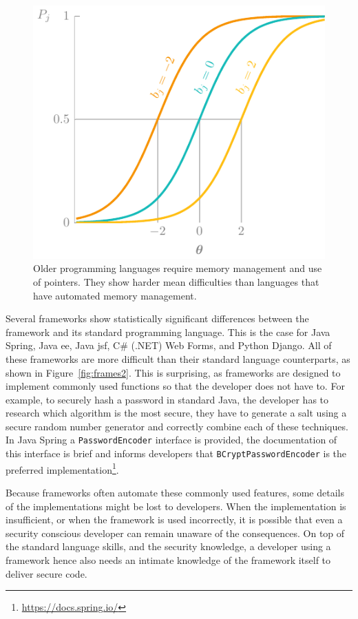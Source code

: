 \begin{figure}
    \centering
    \includegraphics[page=9]{03-education/figures/tikzfigures.pdf}
    \caption[Memory-safe versus memory-unsafe languages]{Older programming languages require memory management and use of pointers. They show harder mean difficulties than languages that have automated memory management.}
    \label{fig:frames1}
\end{figure}

Several frameworks show statistically significant differences between the framework and its standard programming language.
This is the case for Java Spring, Java \gls{ee}, Java \gls{jsf}, C\# (.NET) Web Forms, and Python Django.
All of these frameworks are more difficult than their standard language counterparts, as shown in Figure~\ref{fig:frames2}.
This is surprising, as frameworks are designed to implement commonly used functions so that the developer does not have to.
For example, to securely hash a password in standard Java, the developer has to research which algorithm is the most secure, they have to generate a salt using a secure random number generator and correctly combine each of these techniques.
In Java Spring a \texttt{PasswordEncoder} interface is provided, the documentation of this interface is brief and informs developers that \texttt{BCryptPasswordEncoder} is the preferred implementation\footnote{\url{https://docs.spring.io/}}.

Because frameworks often automate these commonly used features, some details of the implementations might be lost to developers.
When the implementation is insufficient, or when the framework is used incorrectly, it is possible that even a security conscious developer can remain unaware of the consequences.
On top of the standard language skills, and the security knowledge, a developer using a framework hence also needs an intimate knowledge of the framework itself to deliver secure code.

